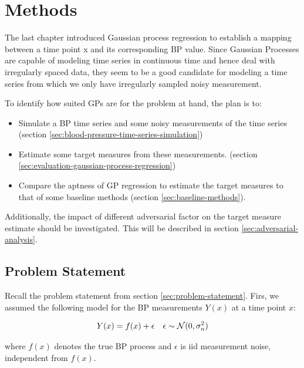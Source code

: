 \usepackage{amsmath}\chapter{Methods}\label{ch:methods}

The last chapter introduced Gaussian process regression
to establish a mapping between a time point x and its
corresponding BP value.
Since Gaussian Processes are capable of modeling time series in continuous
time and hence deal with irregularly spaced data,
they seem to be a good candidate for modeling a time series from which
we only have irregularly sampled noisy measurement.


To identify how suited GPs are for the problem at hand, the plan is to:
\begin{itemize}
    \item Simulate a BP time series and some noisy measurements of the time series
    (section \ref{sec:blood-pressure-time-series-simulation})
    \item Estimate some target measures from these measurements.
    (section \ref{sec:evaluation-gaussian-process-regression})
    \item Compare the aptness of GP regression to estimate the target measures
    to that of some baseline methods (section \ref{sec:baseline-methods}).

\end{itemize}

Additionally, the impact of different adversarial factor on the target measure estimate
should be investigated.
This will be described in section \ref{sec:adversarial-analysis}.


\section{Problem Statement}

Recall the problem statement from section \ref{sec:problem-statement}.
Firs, we assumed the following model for the BP measurements
$Y(x)$ at a time point $x$:

\begin{align*}
    Y(x) = f(x) + \epsilon && \epsilon \sim \operatorname{\mathcal{N}}(0, \sigma_n^{2})
\end{align*}

where $f(x)$ denotes the true BP process and $\epsilon$ is iid measurement noise,
independent from $f(x)$.

